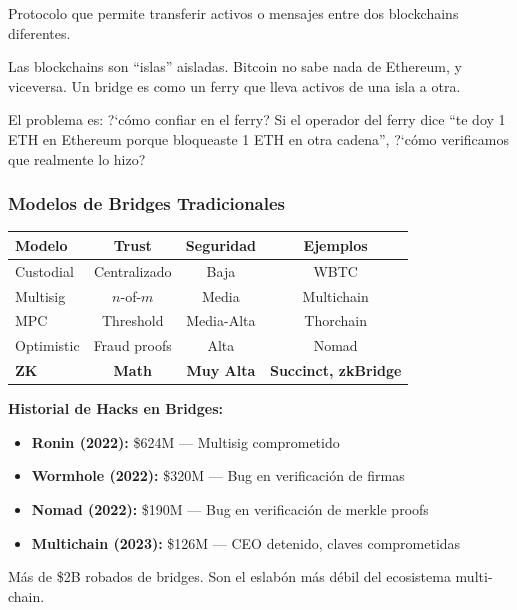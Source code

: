 \documentclass[11pt,a4paper,twoside]{book}
\begin{document}
\begin{definition}
Protocolo que permite transferir activos o mensajes entre dos blockchains diferentes.
\end{definition}

\begin{intuicion}
Las blockchains son ``islas'' aisladas. Bitcoin no sabe nada de Ethereum, y viceversa. Un bridge es como un ferry que lleva activos de una isla a otra.

El problema es: ?`c\'omo confiar en el ferry? Si el operador del ferry dice ``te doy 1 ETH en Ethereum porque bloqueaste 1 ETH en otra cadena'', ?`c\'omo verificamos que realmente lo hizo?
\end{intuicion}

\subsubsection{Modelos de Bridges Tradicionales}

\begin{center}
\begin{tabular}{lccc}
\toprule
\textbf{Modelo} & \textbf{Trust} & \textbf{Seguridad} & \textbf{Ejemplos} \\
\midrule
Custodial & Centralizado & Baja & WBTC \\
Multisig & $n$-of-$m$ & Media & Multichain \\
MPC & Threshold & Media-Alta & Thorchain \\
Optimistic & Fraud proofs & Alta & Nomad \\
\textbf{ZK} & \textbf{Math} & \textbf{Muy Alta} & \textbf{Succinct, zkBridge} \\
\bottomrule
\end{tabular}
\end{center}

\begin{remark}
\textbf{Historial de Hacks en Bridges:}
\begin{itemize}
    \item \textbf{Ronin (2022):} \$624M --- Multisig comprometido
    \item \textbf{Wormhole (2022):} \$320M --- Bug en verificaci\'on de firmas
    \item \textbf{Nomad (2022):} \$190M --- Bug en verificaci\'on de merkle proofs
    \item \textbf{Multichain (2023):} \$126M --- CEO detenido, claves comprometidas
\end{itemize}

M\'as de \$2B robados de bridges. Son el eslab\'on m\'as d\'ebil del ecosistema multi-chain.
\end{remark}
\end{document}
